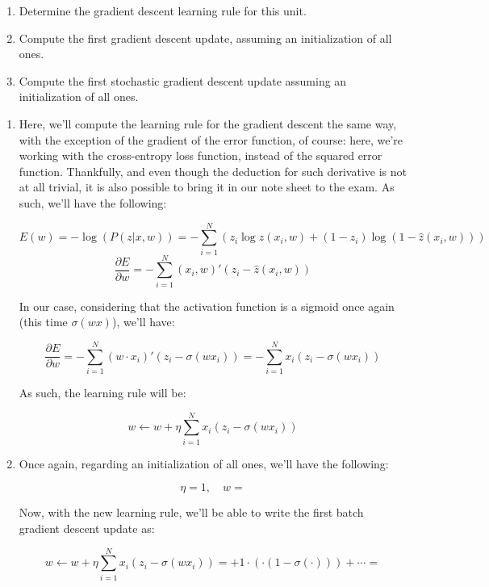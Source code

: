 \documentclass[12pt]{article}
\begin{document}
\begin{enumerate}[leftmargin=\labelsep]
\begin{tcolorbox}[enhanced jigsaw,colback=bg,boxrule=0pt,arc=1pt,halign=center]
    \begin{enumerate}
      \item Determine the gradient descent learning rule for this unit.
      \item Compute the first gradient descent update, assuming an initialization of all ones.
      \item Compute the first stochastic gradient descent update assuming an initialization of all ones.
    \end{enumerate}
  \end{tcolorbox}

  \begin{enumerate}
    \item {
      Here, we'll compute the learning rule for the gradient descent the same way,
      with the exception of the gradient of the error function, of course: here,
      we're working with the cross-entropy loss function, instead of the squared
      error function. Thankfully, and even though the deduction for such derivative
      is not at all trivial, it is also possible to bring it in our note sheet
      to the exam. As such, we'll have the following:

      $$
        E(w) = - \log(P(z|x, w)) = - \sum_{i=1}^N (z_i \log \hat{z}(x_i, w) + (1 - z_i) \log (1 - \hat{z}(x_i, w)))
      $$
      $$
        \frac{\partial E}{\partial w} = - \sum_{i=1}^N (x_i, w)' (z_i - \hat{z}(x_i, w))
      $$

      In our case, considering that the activation function is a sigmoid once again
      (this time $\sigma(wx)$), we'll have:

      $$
        \frac{\partial E}{\partial w} = - \sum_{i=1}^N (w \cdot x_i)' (z_i - \sigma(w x_i))
        = - \sum_{i=1}^N x_i (z_i - \sigma(w x_i))
      $$

      As such, the learning rule will be:

      $$
        w \leftarrow w + \eta \sum_{i=1}^N x_i (z_i - \sigma(w x_i))
      $$
    }
    \item {
      Once again, regarding an initialization of all ones, we'll have the following:

      $$
        \eta = 1, \quad w = 
      $$

      Now, with the new learning rule, we'll be able to write the first batch
      gradient descent update as:

      $$
        w \leftarrow w + \eta \sum_{i=1}^N x_i (z_i - \sigma(w x_i))
        =  + 1 \cdot \left(
           \cdot \left(
            1 - \sigma( \cdot )
          \right)
        \right) + \cdots = 
      $$

}
\end{enumerate}
\end{enumerate}
\end{document}

